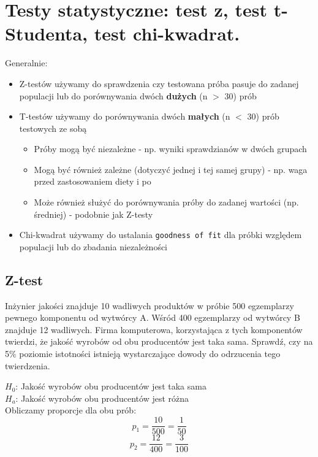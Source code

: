 \documentclass[main.tex]{subfiles}
\begin{document}
    \section{Testy statystyczne: test z, test t-Studenta, test chi-kwadrat.}
    Generalnie:
    \begin{itemize}
        \item Z-testów używamy do sprawdzenia czy testowana próba pasuje do zadanej populacji lub do porównywania dwóch \textbf{dużych} (n $>$ 30) prób
        \item T-testów używamy do porównywania dwóch \textbf{małych} (n $<$ 30) prób testowych ze sobą
        \begin{itemize}
            \item Próby mogą być niezależne - np. wyniki sprawdzianów w dwóch grupach
            \item Mogą być również zależne (dotyczyć jednej i tej samej grupy) - np. waga przed zastosowaniem diety i po
            \item Może również służyć do porównywania próby do zadanej wartości (np. średniej) - podobnie jak Z-testy
        \end{itemize}
        \item Chi-kwadrat używamy do ustalania \texttt{goodness of fit} dla próbki względem populacji lub do zbadania niezależności
    \end{itemize}

    \subsection{Z-test}
    \begin{exercise}
        Inżynier jakości znajduje 10 wadliwych produktów w próbie 500 egzemplarzy pewnego komponentu od wytwórcy A. Wśród 400 egzemplarzy od wytwórcy B znajduje 12 wadliwych. Firma komputerowa, korzystająca z tych komponentów twierdzi, że jakość wyrobów od obu producentów jest taka sama. Sprawdź, czy na 5\% poziomie istotności istnieją wystarczające dowody do odrzucenia tego twierdzenia.
    \end{exercise}

    $H_{0}$: Jakość wyrobów obu producentów jest taka sama \\

    $H_{a}$: Jakość wyrobów obu producentów jest różna \\

    Obliczamy proporcje dla obu prób:
    \begin{equation*}
        p_{1} = \frac{10}{500} = \frac{1}{50}
    \end{equation*}
    \begin{equation*}
        p_{2} = \frac{12}{400} = \frac{3}{100}
    \end{equation*}
\end{document}
